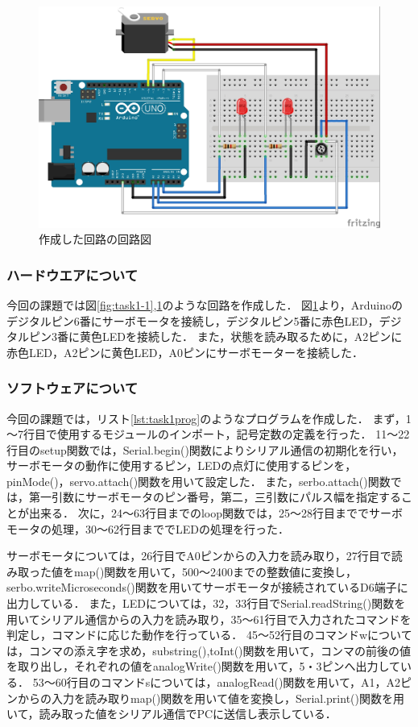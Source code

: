 \documentclass{ltjsarticle}
\begin{document}
\begin{figure}[h]
    \centering
    \includegraphics[width=\linewidth]{figures/0628fig.jpg}
    \caption{作成した回路の回路図}
    \label{fig:task1-2}
\end{figure}
\clearpage



\subsubsection*{ハードウエアについて}
今回の課題では図\ref{fig:task1-1},\ref{fig:task1-2}のような回路を作成した．
図\ref{fig:task1-2}より，Arduinoのデジタルピン6番にサーボモータを接続し，デジタルピン5番に赤色LED，デジタルピン3番に黄色LEDを接続した．
また，状態を読み取るために，A2ピンに赤色LED，A2ピンに黄色LED，A0ピンにサーボモーターを接続した．

\subsubsection*{ソフトウェアについて}
今回の課題では，リスト\ref{lst:task1prog}のようなプログラムを作成した．
まず，1～7行目で使用するモジュールのインポート，記号定数の定義を行った．
11～22行目のsetup関数では，Serial.begin()関数によりシリアル通信の初期化を行い，サーボモータの動作に使用するピン，LEDの点灯に使用するピンを，pinMode()，servo.attach()関数を用いて設定した．
また，serbo.attach()関数では，第一引数にサーボモータのピン番号，第二，三引数にパルス幅を指定することが出来る．
次に，24～63行目までのloop関数では，25～28行目まででサーボモータの処理，30～62行目まででLEDの処理を行った．


サーボモータについては，26行目でA0ピンからの入力を読み取り，27行目で読み取った値をmap()関数を用いて，500～2400までの整数値に変換し，serbo.writeMicroseconds()関数を用いてサーボモータが接続されているD6端子に出力している．
また，LEDについては，32，33行目でSerial.readString()関数を用いてシリアル通信からの入力を読み取り，35～61行目で入力されたコマンドを判定し，コマンドに応じた動作を行っている．
45～52行目のコマンドwについては，コンマの添え字を求め，substring(),toInt()関数を用いて，コンマの前後の値を取り出し，それぞれの値をanalogWrite()関数を用いて，5・3ピンへ出力している．
53～60行目のコマンドsについては，analogRead()関数を用いて，A1，A2ピンからの入力を読み取りmap()関数を用いて値を変換し，Serial.print()関数を用いて，読み取った値をシリアル通信でPCに送信し表示している．
\end{document}
